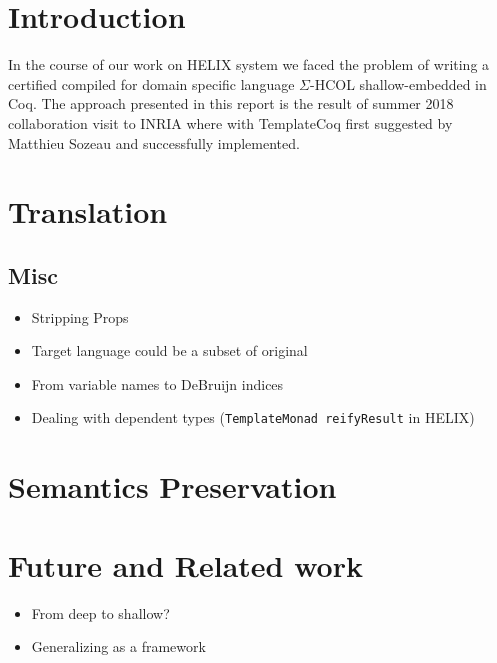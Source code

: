 \documentclass[sigplan]{acmart}\settopmatter{printfolios=true,printccs=false,printacmref=false}
\begin{document}


\maketitle

\section{Introduction}

In the course of our work on HELIX system\cite{helixFHPC18} we faced
the problem of writing a certified compiled for domain specific
language $\Sigma$-HCOL shallow-embedded in Coq. The approach presented
in this report is the result of summer 2018 collaboration visit to
INRIA where with TemplateCoq\cite{anand2018towards} first suggested by
Matthieu Sozeau and successfully implemented.


\section{Translation}


\subsection{Misc}
\begin{itemize}
\item Stripping Props
\item Target language could be a subset of original
\item From variable names to DeBruijn indices
\item Dealing with dependent types (\verb|TemplateMonad reifyResult| in HELIX)
\end{itemize}
\section{Semantics Preservation}
  
\section{Future and Related work}
\begin{itemize}
\item From deep to shallow?
\item Generalizing as a framework
\end{itemize}

%




\nocite{*}


\end{document}

